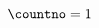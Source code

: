 $$%
\def\numcases#1{\left\{\,\vcenter{\baselineskip=15pt\m@th%
     \ialign{$\displaystyle##\hfil$&\rm\tqs##\hfil 
     \crcr#1\crcr}}\right.\hfill 
     \vcenter{\baselineskip=15pt\m@th%
     \ialign{\rlap{$\phantom{\displaystyle##\hfil}$}\tabskip=0pt&\en 
     \rlap{\phantom{##\hfil}}\crcr#1\crcr}}} 
% 
\def\ptnumcases#1{\left\{\,\vcenter{\baselineskip=15pt\m@th%
     \ialign{$\displaystyle##\hfil$&\rm\tqs##\hfil 
     \crcr#1\crcr}}\right.\hfill 
     \vcenter{\baselineskip=15pt\m@th%
     \ialign{\rlap{$\phantom{\displaystyle##\hfil}$}\tabskip=0pt&\enpt 
     \rlap{\phantom{##\hfil}}\crcr#1\crcr}}\global\eqlett=97 
     \global\advance\countno by 1} 
% 
% 
\def\eq(#1){\ifaligned\@mp(#1)\else\hfill\llap{{\rm (#1)}}\fi} 
\def\ceq(#1){\ns\ns\ifaligned\@mp\fi\eq(#1)\cr\ns\ns} 
\def\eqpt(#1#2){\ifaligned\@mp(#1{\it #2\/}) 
                    \else\hfill\llap{{\rm (#1{\it #2\/})}}\fi} 
\let\eqno=\eq 
% 
% 
\countno=1 
\def\eqnobysec{\numbysectrue} 
\def\aleq{&\rm(\ifappendix\applett 
               \ifnumbysec\ifnum\secno>0 \the\secno\fi.\fi 
               \else\ifnumbysec\the\secno.\fi\fi\the\countno} 
\def\noaleq{\hfill\llap\bgroup\rm(\ifappendix\applett 
               \ifnumbysec\ifnum\secno>0 \the\secno\fi.\fi 
               \else\ifnumbysec\the\secno.\fi\fi\the\countno} 
\def\@mp{&} 
\def\en{\ifaligned\aleq)\else\noaleq)\egroup\fi\gac} 
\def\cen{\ns\ns\ifaligned\@mp\fi\en\cr\ns\ns} 
\def\enpt{\ifaligned\aleq{\it\char\the\eqlett})\else 
    \noaleq{\it\char\the\eqlett})\egroup\fi 
    \global\advance\eqlett by 1} 
\def\endpt{\ifaligned\aleq{\it\char\the\eqlett})\else 
    \noaleq{\it\char\the\eqlett})\egroup\fi 
    \global\eqlett=97\gac} 
% 
% 
\def\CQG{{\it Class. Quantum Grav.}} 
\def\IP{{\it Inverse Problems\/}} 
\def\JPA{{\it J. Phys. A: Math. Gen.}} 
\def\JPB{{\it J. Phys. B: At. Mol. Phys.}}        %
\def\jpb{{\it J. Phys. B: At. Mol. Opt. Phys.}}   %
\def\JPC{{\it J. Phys. C: Solid State Phys.}}     %
\def\JPCM{{\it J. Phys.: Condens. Matter\/}}        %
\def\JPD{{\it J. Phys. D: Appl. Phys.}} 
\def\JPE{{\it J. Phys. E: Sci. Instrum.}} 
\def\JPF{{\it J. Phys. F: Met. Phys.}} 
\def\JPG{{\it J. Phys. G: Nucl. Phys.}}           %
\def\jpg{{\it J. Phys. G: Nucl. Part. Phys.}}     %
\def\MSMSE{{\it Modelling Simulation Mater. Sci. Eng.}} 
\def\MST{{\it Meas. Sci. Technol.}}                 %
\def\NET{{\it Network\/}} 
$$
